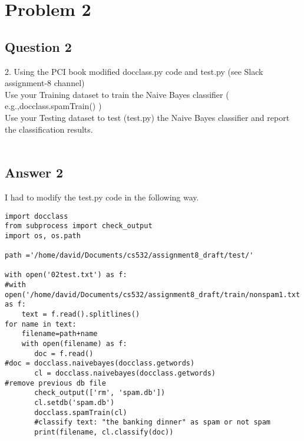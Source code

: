 \documentclass[10pt,letterpaper]{article}
\begin{document}
\section{Problem 2}
\subsection{Question 2}
2. Using the PCI book modified docclass.py code and test.py (see Slack assignment-8 channel)\\
Use your Training dataset to train the Naive Bayes classifier ( e.g.,docclass.spamTrain() )\\
Use your Testing dataset to test (test.py) the Naive Bayes classifier and report the classification results.\\
\\
\subsection{Answer 2}
I had to modify the test.py code in the following way.
\begin{lstlisting}
import docclass
from subprocess import check_output
import os, os.path

path ='/home/david/Documents/cs532/assignment8_draft/test/'

with open('02test.txt') as f:
#with open('/home/david/Documents/cs532/assignment8_draft/train/nonspam1.txt') as f:
    text = f.read().splitlines()
for name in text:
    filename=path+name             
    with open(filename) as f:
       doc = f.read()
#doc = docclass.naivebayes(docclass.getwords)
       cl = docclass.naivebayes(docclass.getwords)
#remove previous db file
       check_output(['rm', 'spam.db'])
       cl.setdb('spam.db')
       docclass.spamTrain(cl)
       #classify text: "the banking dinner" as spam or not spam
       print(filename, cl.classify(doc))
\end{lstlisting}
\end{document}
